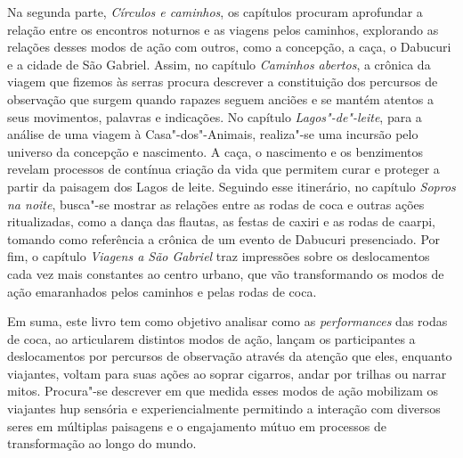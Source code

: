 Na segunda parte, \emph{Círculos e caminhos}, os capítulos procuram
aprofundar a relação entre os encontros noturnos e as viagens pelos
caminhos, explorando as relações desses modos de ação com outros, como a
concepção, a caça, o Dabucuri e a cidade de São Gabriel. Assim, no
capítulo \emph{Caminhos abertos}, a crônica da viagem que fizemos às
serras procura descrever a constituição dos percursos de observação que
surgem quando rapazes seguem anciões e se mantém atentos a seus
movimentos, palavras e indicações. No capítulo \emph{Lagos"-de"-leite},
para a análise de uma viagem à Casa"-dos"-Animais, realiza"-se uma incursão
pelo universo da concepção e nascimento. A caça, o nascimento e os
benzimentos revelam processos de contínua criação da vida que permitem
curar e proteger a partir da paisagem dos Lagos de leite. Seguindo esse
itinerário, no capítulo \emph{Sopros na noite}, busca"-se mostrar as
relações entre as rodas de coca e outras ações ritualizadas, como a
dança das flautas, as festas de caxiri e as rodas de caarpi, tomando
como referência a crônica de um evento de Dabucuri presenciado. Por fim,
o capítulo \emph{Viagens a São Gabriel} traz impressões sobre os
deslocamentos cada vez mais constantes ao centro urbano, que vão
transformando os modos de ação emaranhados pelos caminhos e pelas rodas
de coca.

Em suma, este livro tem como objetivo analisar como as
\emph{performances} das rodas de coca, ao articularem distintos modos de
ação, lançam os participantes a deslocamentos por percursos de
observação através da atenção que eles, enquanto viajantes, voltam para
suas ações ao soprar cigarros, andar por trilhas ou narrar mitos.
Procura"-se descrever em que medida esses modos de ação mobilizam os
viajantes hup sensória e experiencialmente permitindo a interação com
diversos seres em múltiplas paisagens e o engajamento mútuo em processos
de transformação ao longo do mundo.